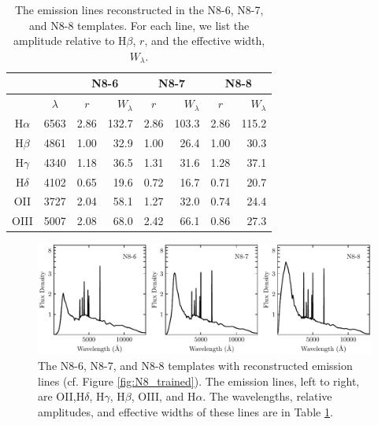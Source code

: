 \begin{table}
    \centering
    \caption{The emission lines reconstructed in the N8-6, N8-7, and N8-8 templates. For each line, we list the amplitude relative to H$\beta$, $r$, and the effective width, $W_\lambda$.}
    \begin{tabular}{c c | c r | c r | c r }
        \hline \hline
         & & \multicolumn{2}{c|}{N8-6} & \multicolumn{2}{c|}{N8-7} & \multicolumn{2}{c}{N8-8} \\
        \hline
         & $\lambda$ & $r$ & $W_\lambda$ & $r$ & $W_\lambda$ & $r$ & $W_\lambda$ \\
        \hline
        H$\alpha$ & 6563 & 2.86 & 132.7 & 2.86 & 103.3 & 2.86 & 115.2 \\
        H$\beta$  & 4861 & 1.00 &  32.9 & 1.00 &  26.4 & 1.00 &  30.3 \\
        H$\gamma$ & 4340 & 1.18 &  36.5 & 1.31 &  31.6 & 1.28 &  37.1 \\
        H$\delta$ & 4102 & 0.65 &  19.6 & 0.72 &  16.7 & 0.71 &  20.7 \\
        OII       & 3727 & 2.04 &  58.1 & 1.27 &  32.0 & 0.74 &  24.4 \\
        OIII      & 5007 & 2.08 &  68.0 & 2.42 &  66.1 & 0.86 &  27.3 \\

        \hline
    \end{tabular}
    \label{tab:speclines}
\end{table}

\begin{figure}
    \centering
    \includegraphics{figures/N8_spectral_lines.pdf}
    \caption{The N8-6, N8-7, and N8-8 templates with reconstructed emission lines (cf. Figure \ref{fig:N8_trained}). The emission lines, left to right, are OII,H$\delta$, H$\gamma$, H$\beta$, OIII, and H$\alpha$. The wavelengths, relative amplitudes, and effective widths of these lines are in Table \ref{tab:speclines}.}
    \label{fig:speclines}
\end{figure}